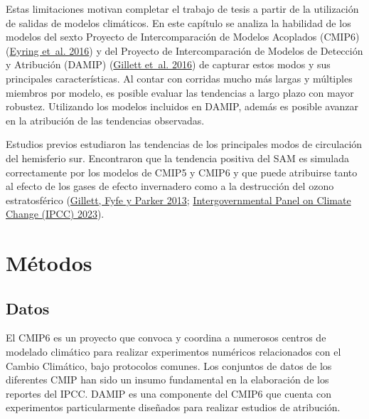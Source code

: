 \documentclass[12pt,oneside,a4paper]{reedthesis}
\begin{document}
Estas limitaciones motivan completar el trabajo de tesis a partir de la utilización de salidas de modelos climáticos.
En este capítulo se analiza la habilidad de los modelos del sexto Proyecto de Intercomparación de Modelos Acoplados (CMIP6) (\protect\hyperlink{ref-eyring2016}{Eyring et~al. 2016}) y del Proyecto de Intercomparación de Modelos de Detección y Atribución (DAMIP) (\protect\hyperlink{ref-gillett2016}{Gillett et~al. 2016}) de capturar estos modos y sus principales características.
Al contar con corridas mucho más largas y múltiples miembros por modelo, es posible evaluar las tendencias a largo plazo con mayor robustez.
Utilizando los modelos incluidos en DAMIP, además es posible avanzar en la atribución de las tendencias observadas.

Estudios previos estudiaron las tendencias de los principales modos de circulación del hemisferio sur.
Encontraron que la tendencia positiva del SAM es simulada correctamente por los modelos de CMIP5 y CMIP6 y que puede atribuirse tanto al efecto de los gases de efecto invernadero como a la destrucción del ozono estratosférico (\protect\hyperlink{ref-gillett2013}{Gillett, Fyfe y Parker 2013}; \protect\hyperlink{ref-ipcc6ch3}{Intergovernmental Panel on Climate Change (IPCC) 2023}).

\hypertarget{muxe9todos-2}{%
\section{Métodos}\label{muxe9todos-2}}

\hypertarget{datos-3}{%
\subsection{Datos}\label{datos-3}}

El CMIP6 es un proyecto que convoca y coordina a numerosos centros de modelado climático para realizar experimentos numéricos relacionados con el Cambio Climático, bajo protocolos comunes.
Los conjuntos de datos de los diferentes CMIP han sido un insumo fundamental en la elaboración de los reportes del IPCC.
DAMIP es una componente del CMIP6 que cuenta con experimentos particularmente diseñados para realizar estudios de atribución.
\end{document}
